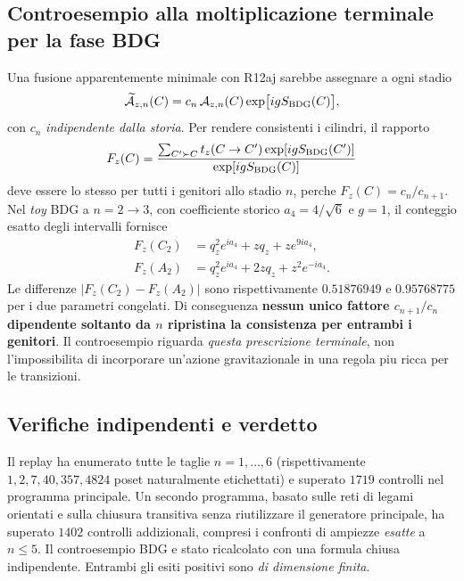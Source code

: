 \documentclass[11pt,a4paper]{article}
\begin{document}
\subsection{Controesempio alla moltiplicazione terminale per la fase BDG}
Una fusione apparentemente minimale con R12aj sarebbe assegnare a ogni stadio
\begin{equation}
 \widetilde {\cal A}_{z,n}(C)=c_n\,{\cal A}_{z,n}(C)
 \exp\bigl[igS_{\rm BDG}(C)\bigr],
 \label{eq:r12am_terminal_phase}
\end{equation}
con $c_n$ \emph{indipendente dalla storia}. Per rendere consistenti i cilindri, il rapporto
\begin{equation}
 F_z(C)=\frac{\sum_{C'\succ C}t_z(C\to C')\exp[igS_{\rm BDG}(C')]}
 {\exp[igS_{\rm BDG}(C)]}
 \label{eq:r12am_F}
\end{equation}
deve essere lo stesso per tutti i genitori allo stadio $n$, perche $F_z(C)=c_n/c_{n+1}$. Nel \emph{toy} BDG a $n=2\to3$, con coefficiente storico $a_4=4/\sqrt6$ e $g=1$, il conteggio esatto degli intervalli fornisce
\begin{align}
 F_z(C_2)&=q_z^2e^{ia_4}+zq_z+ze^{9ia_4},\\
 F_z(A_2)&=q_z^2e^{ia_4}+2zq_z+z^2e^{-ia_4}.
 \label{eq:r12am_parent_F}
\end{align}
Le differenze $|F_z(C_2)-F_z(A_2)|$ sono rispettivamente $0.51876949$ e $0.95768775$ per i due parametri congelati. Di conseguenza \textbf{nessun unico fattore $c_{n+1}/c_n$ dipendente soltanto da $n$ ripristina la consistenza per entrambi i genitori}. Il controesempio riguarda \emph{questa prescrizione terminale}, non l'impossibilita di incorporare un'azione gravitazionale in una regola piu ricca per le transizioni.

\subsection{Verifiche indipendenti e verdetto}
Il replay ha enumerato tutte le taglie $n=1,\ldots,6$ (rispettivamente $1,2,7,40,357,4824$ poset naturalmente etichettati) e superato $1719$ controlli nel programma principale. Un secondo programma, basato sulle reti di legami orientati e sulla chiusura transitiva senza riutilizzare il generatore principale, ha superato $1402$ controlli addizionali, compresi i confronti di ampiezze \emph{esatte} a $n\le5$. Il controesempio BDG e stato ricalcolato con una formula chiusa indipendente. Entrambi gli esiti positivi sono \emph{di dimensione finita}.
\end{document}
